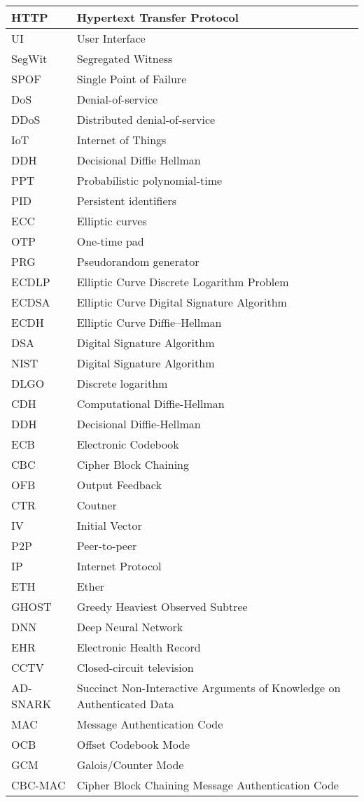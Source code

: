 \begin{center}
\begin{longtable}{ |l @{\qquad} |l| }
	HTTP    & Hypertext Transfer Protocol \\ \hline
	UI    & User Interface \\ \hline
	SegWit    & Segregated Witness \\ \hline
	SPOF    & Single Point of Failure \\ \hline
	DoS    & Denial-of-service \\ \hline
	DDoS    & Distributed denial-of-service \\ \hline
	IoT    & Internet of Things \\ \hline
	DDH    & Decisional Diffie Hellman \\ \hline
	PPT    & Probabilistic polynomial-time \\ \hline
	PID    & Persistent identifiers \\ \hline
	ECC    & Elliptic curves \\ \hline
	OTP    & One-time pad\\ \hline
	PRG    & Pseudorandom generator\\ \hline
	ECDLP    & Elliptic Curve Discrete Logarithm Problem\\ \hline
	ECDSA    & Elliptic Curve Digital Signature Algorithm\\ \hline
	ECDH    & Elliptic Curve Diffie–Hellman\\ \hline
	DSA    & Digital Signature Algorithm\\ \hline
	NIST    & Digital Signature Algorithm\\ \hline
	DLGO    & Discrete logarithm\\ \hline
	CDH    & Computational Diffie-Hellman\\ \hline
	DDH    & Decisional Diffie-Hellman\\ \hline
	ECB    & Electronic Codebook\\ \hline
	CBC    & Cipher Block Chaining\\ \hline
	OFB    & Output Feedback\\ \hline
	CTR    & Coutner\\ \hline
	IV    & Initial Vector\\ \hline
	P2P    & Peer-to-peer\\ \hline
	IP    & Internet Protocol\\ \hline
	ETH    & Ether\\ \hline
	GHOST    & Greedy Heaviest Observed Subtree\\ \hline
	DNN    & Deep Neural Network\\ \hline
	EHR    & Electronic Health Record\\ \hline
	CCTV    & Closed-circuit television\\ \hline
	AD-SNARK    & Succinct Non-Interactive Arguments of Knowledge on Authenticated Data\\ \hline
	MAC    & Message Authentication Code\\ \hline
	OCB    & Offset Codebook Mode\\ \hline
	GCM    & Galois/Counter Mode\\ \hline
	CBC-MAC    & Cipher Block Chaining Message Authentication Code\\
	\hline
	\end{longtable}
\end{center}
